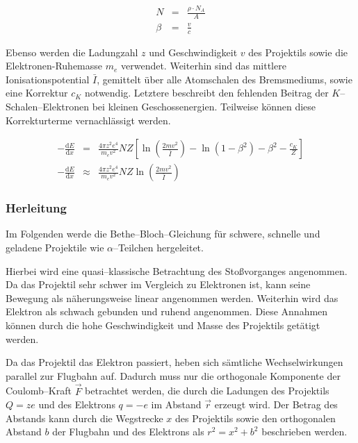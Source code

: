 \documentclass[12pt,a4paper]{scrartcl}
\numberwithin{equation}{section} %
\begin{document}
\begin{eqnarray}
    N &=& \frac{\rho\cdot N_A}{A} \\
    \beta &=& \frac{v}{c}
\end{eqnarray}

\noindent
Ebenso werden die Ladungzahl $z$ und Geschwindigkeit $v$ des Projektils sowie die Elektronen-Ruhemasse $m_e$ verwendet. Weiterhin sind das mittlere Ionisationspotential $\bar I$, gemittelt über alle Atomschalen des Bremsmediums, sowie eine Korrektur $c_K$ notwendig. Letztere beschreibt den fehlenden Beitrag der $K$--Schalen--Elektronen bei kleinen Geschossenergien. Teilweise können diese Korrekturterme vernachlässigt werden.

\begin{eqnarray}
    -\frac{\mathrm dE}{\mathrm dx} &=&
        \frac{4\pi z^2 e^4}{m_e v^2} NZ
        \left[
            \ln\left(\frac{2mv^2}{\bar I}\right)
            - \ln\left(1 - \beta^2\right)
            - \beta^2
            - \frac{c_K}{Z}
        \right]
        \label{BetheBloch} \\
    -\frac{\mathrm dE}{\mathrm dx} &\approx&
        \frac{4\pi z^2 e^4}{m_e v^2} NZ
        \ln\left(\frac{2mv^2}{\bar I}\right)
        \label{BetheBloch2}
\end{eqnarray}

\hypertarget{herleitung}{%
\subsubsection{Herleitung}\label{herleitung}}

Im Folgenden werde die Bethe--Bloch--Gleichung für schwere, schnelle und geladene Projektile wie $\alpha$--Teilchen hergeleitet.

Hierbei wird eine quasi--klassische Betrachtung des Stoßvorganges angenommen. Da das Projektil sehr schwer im Vergleich zu Elektronen ist, kann seine Bewegung als näherungsweise linear angenommen werden. Weiterhin wird das Elektron als schwach gebunden und ruhend angenommen. Diese Annahmen können durch die hohe Geschwindigkeit und Masse des Projektils getätigt werden.

Da das Projektil das Elektron passiert, heben sich sämtliche Wechselwirkungen parallel zur Flugbahn auf. Dadurch muss nur die orthogonale Komponente der Coulomb--Kraft $\vec F$ betrachtet werden, die durch die Ladungen des Projektils $Q=ze$ und des Elektrons $q=-e$ im Abstand $\vec r$ erzeugt wird. Der Betrag des Abstands kann durch die Wegstrecke $x$ des Projektils sowie den orthogonalen Abstand $b$ der Flugbahn und des Elektrons als $r^2=x^2+b^2$ beschrieben werden.
\end{document}
